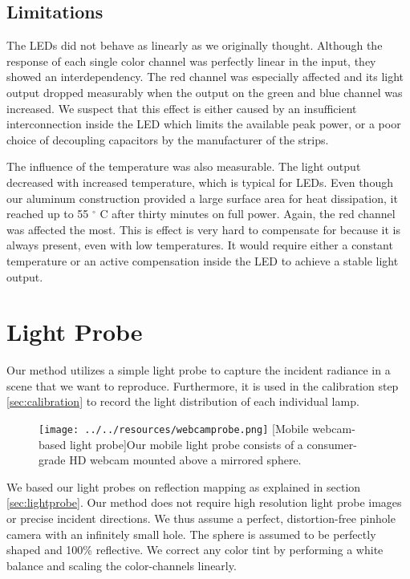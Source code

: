 \subsection{Limitations}
\label{sec:ledlimitations}

The LEDs did not behave as linearly as we originally thought. 
Although the response of each single color channel was perfectly linear in the input, they showed an interdependency.
The red channel was especially affected and its light output dropped measurably when the output on the green and blue channel was increased.
We suspect that this effect is either caused by an insufficient interconnection inside the LED which limits the available peak power, or a poor choice of decoupling capacitors by the manufacturer of the strips.

The influence of the temperature was also measurable. The light output decreased with increased temperature, which is typical for LEDs.
Even though our aluminum construction provided a large surface area for heat dissipation, it reached up to 55 $^{\circ}$ C after thirty minutes on full power.
Again, the red channel was affected the most.
This is effect is very hard to compensate for because it is always present, even with low temperatures.
It would require either a constant temperature or an active compensation inside the LED to achieve a stable light output.


\section{Light Probe} 
 \label{sec:probe}
 
 Our method utilizes a simple light probe to capture the incident radiance in a scene that we want to reproduce. 
 Furthermore, it is used in the calibration step \ref{sec:calibration} to record the light distribution of each individual lamp.
  
 
 \begin{figure}[H]
  \centering
  \texttt{[image: ../../resources/webcamprobe.png]} 
  [Mobile webcam-based light probe]{Our mobile light probe consists of a consumer-grade HD webcam mounted above a mirrored sphere.}
  \label{fig:webcamprobe}
  \end{figure}
 
 We based our light probes on reflection mapping as explained in section \ref{sec:lightprobe}.
 Our method does not require high resolution light probe images or precise incident directions. 
 We thus assume a perfect, distortion-free pinhole camera with an infinitely small hole. 
 The sphere is assumed to be perfectly shaped and 100\% reflective.
 We correct any color tint by performing a white balance and scaling the color-channels linearly.

